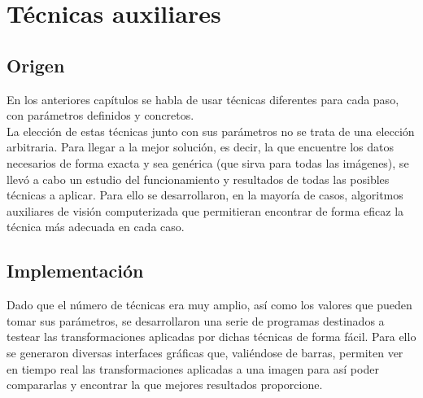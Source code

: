 \chapter{Técnicas auxiliares}
\section{Origen}
En los anteriores capítulos se habla de usar técnicas diferentes 
para cada paso, con parámetros definidos y concretos. \\
La elección de estas técnicas junto con sus parámetros no se trata
de una elección arbitraria. Para llegar a la mejor solución, es decir,
la que encuentre los datos necesarios de forma exacta y sea genérica
(que sirva para todas las imágenes), se llevó a cabo un estudio del
funcionamiento y resultados de todas las posibles técnicas a aplicar.
Para ello se desarrollaron, en la mayoría de casos, algoritmos 
auxiliares de visión computerizada que permitieran encontrar de 
forma eficaz la técnica más adecuada en cada caso.

\section{Implementación}
Dado que el número de técnicas era muy amplio, así como los valores
que pueden tomar sus parámetros, se desarrollaron una serie de 
programas destinados a testear las transformaciones aplicadas por
dichas técnicas de forma fácil. Para ello se generaron diversas
interfaces gráficas que, valiéndose de barras, permiten ver
en tiempo real las transformaciones aplicadas a una imagen para así
poder compararlas y encontrar la que mejores resultados proporcione.